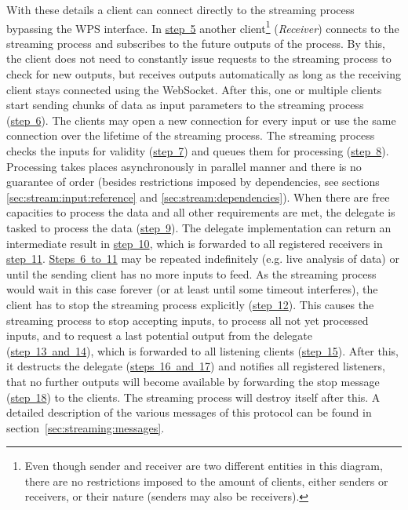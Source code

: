 		With these details a client can connect directly to the streaming process bypassing the \ac{WPS} interface. In \hyperref[fig:sd:swps]{step~5} another client\footnote{Even though sender and receiver are two different entities in this diagram, there are no restrictions imposed to the amount of clients, either senders or receivers, or their nature (senders may also be receivers).} (\emph{Receiver}) connects to the streaming process and subscribes to the future outputs of the process. By this, the client does not need to constantly issue requests to the streaming process to check for new outputs, but receives outputs automatically as long as the receiving client stays connected using the WebSocket.
		After this, one or multiple clients start sending chunks of data as input parameters to the streaming process (\hyperref[fig:sd:swps]{step~6}). The clients may open a new connection for every input or use the same connection over the lifetime of the streaming process. The streaming process checks the inputs for validity (\hyperref[fig:sd:swps]{step~7}) and queues them for processing (\hyperref[fig:sd:swps]{step~8}).
		Processing takes places asynchronously in parallel manner and there is no guarantee of order (besides restrictions imposed by dependencies, see sections \ref{sec:stream:input:reference} and \ref{sec:stream:dependencies}). When there are free capacities to process the data and all other requirements are met, the delegate is tasked to process the data (\hyperref[fig:sd:swps]{step~9}). The delegate implementation can return an intermediate result in \hyperref[fig:sd:swps]{step~10}, which is forwarded to all registered receivers in \hyperref[fig:sd:swps]{step~11}.
		\hyperref[fig:sd:swps]{Steps~6~to~11} may be repeated indefinitely (e.g. live analysis of data) or until the sending client has no more inputs to feed. As the streaming process would wait in this case forever (or at least until some timeout interferes), the client has to stop the streaming process explicitly (\hyperref[fig:sd:swps]{step~12}).
		This causes the streaming process to stop accepting inputs, to process all not yet processed inputs, and to request a last potential output from the delegate (\hyperref[fig:sd:swps]{step~13~and~14}), which is forwarded to all listening clients (\hyperref[fig:sd:swps]{step~15}). After this, it destructs the delegate (\hyperref[fig:sd:swps]{steps~16~and~17}) and notifies all registered listeners, that no further outputs will become available by forwarding the stop message (\hyperref[fig:sd:swps]{step~18}) to the clients. The streaming process will destroy itself after this. A detailed description of the various messages of this protocol can be found in section~\ref{sec:streaming:messages}.

